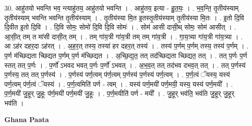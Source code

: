 \documentclass[17pt]{extarticle}
\begin{document}
30. आहु॑तयो भवन्ति भव॒ न्त्याहु॑तय॒ आहु॑तयो भवन्ति । . आहु॑तय॒ इत्या - हु॒त॒यः॒ । . भ॒व॒न्ति॒ तृ॒तीय॑स्याम् तृ॒तीय॑स्याम् भवन्ति भवन्ति तृ॒तीय॑स्याम् । . तृ॒तीय॑स्या मि॒त इ॒तस्तृ॒तीय॑स्याम् तृ॒तीय॑स्या मि॒तः । . इ॒तो दि॒वि दि॒वीत इ॒तो दि॒वि । . दि॒वि सोमः॒ सोमो॑ दि॒वि दि॒वि सोमः॑ । . सोम॑ आसी दासी॒थ् सोमः॒ सोम॑ आसीत् । . आ॒सी॒त् तम् त मा॑सी दासी॒त् तम् । . तम् गा॑य॒त्री गा॑य॒त्री तम् तम् गा॑य॒त्री । . गा॒य॒त्र्या गा॑य॒त्री गा॑य॒त्र्या । . आ ऽह॑र दहर॒दा ऽह॑रत् । . अ॒ह॒र॒त् तस्य॒ तस्या॑ हर दहर॒त् तस्य॑ । . तस्य॑ प॒र्णम् प॒र्णम् तस्य॒ तस्य॑ प॒र्णम् । . प॒र्ण म॑च्छिद्यता च्छिद्यत प॒र्णम् प॒र्ण म॑च्छिद्यत । . अ॒च्छि॒द्य॒त॒ तत् तद॑च्छिद्यता च्छिद्यत॒ तत् । . तत् प॒र्णः प॒र्ण स्तत् तत् प॒र्णः । . प॒र्णो॑ ऽभवद भवत् प॒र्णः प॒र्णो॑ ऽभवत् । . अ॒भ॒व॒त् तत् तद॑भव दभव॒त् तत् । . तत् प॒र्णस्य॑ प॒र्णस्य॒ तत् तत् प॒र्णस्य॑ । . प॒र्णस्य॑ पर्ण॒त्वम् प॑र्ण॒त्वम् प॒र्णस्य॑ प॒र्णस्य॑ पर्ण॒त्वम् । . प॒र्ण॒त्वं ॅयस्य॒ यस्य॑ पर्ण॒त्वम् प॑र्ण॒त्वं ॅयस्य॑ । . प॒र्ण॒त्वमिति॑ पर्ण - त्वम् । . यस्य॑ पर्ण॒मयी॑ पर्ण॒मयी॒ यस्य॒ यस्य॑ पर्ण॒मयी᳚ । . प॒र्ण॒मयी॑ जु॒हूर् जु॒हूः प॑र्ण॒मयी॑ पर्ण॒मयी॑ जु॒हूः । . प॒र्ण॒मयीति॑ पर्ण - मयी᳚ । . जु॒हूर् भव॑ति॒ भव॑ति जु॒हूर् जु॒हूर् भव॑ति । \newline

\textbf{Ghana Paata } \newline
\end{document}
